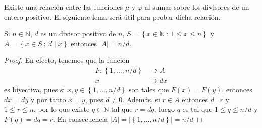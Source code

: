 Existe una relación entre las funciones $\mu$ y $\varphi$ al sumar sobre los divisores de un entero positivo. El siguiente lema será útil para probar dicha relación.

\begin{lemma}\label{lemma:car1}
Si $n\in\mathbb{N}$, $d$ es un divisor positivo de $n$, $S=\left\{x\in\mathbb{N} \: : \: 1\leq x\leq n\right\}$ y $A=\left\{x\in S \: : \: d \mid x\right\}$ entonces $|A|=n/d$.
\end{lemma}
\begin{proof}
En efecto, tenemos que la función
\begin{align*}
	F:\left\{1,\ldots,n/d\right\} & \longrightarrow A \\
	x & \longmapsto dx
\end{align*}
es biyectiva, pues si $x,y\in \left\{1,\ldots,n/d\right\}$ son tales que $F(x)=F(y)$, entonces $dx=dy$ y por tanto $x=y$, pues $d\neq 0$. Además, si $r\in A$ entonces $d \mid r$ y $1\leq r\leq n$, por lo que existe $q\in\mathbb{N}$ tal que $r=dq$, luego $q$ es tal que $1\leq q\leq n/d$ y $F(q)=dq=r$. En consecuencia $|A|=|\left\{1,\ldots,n/d\right\}|=n/d$
\end{proof}

